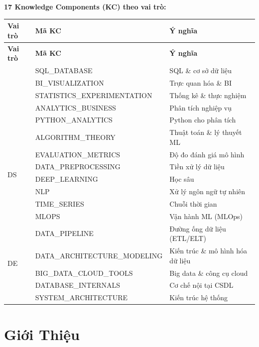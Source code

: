 \documentclass[12pt, a4paper]{report}
\begin{document}
\noindent\textbf{17 Knowledge Components (KC) theo vai trò:}

\begin{longtable}{lll}
\toprule
\textbf{Vai trò} & \textbf{Mã KC} & \textbf{Ý nghĩa} \\
\midrule
\endfirsthead
\toprule
\textbf{Vai trò} & \textbf{Mã KC} & \textbf{Ý nghĩa} \\
\midrule
\endhead
\bottomrule
\endfoot
\multirow{5}{*}{DA}
 & SQL\_DATABASE               & SQL \& cơ sở dữ liệu \\
 & BI\_VISUALIZATION           & Trực quan hóa \& BI \\
 & STATISTICS\_EXPERIMENTATION & Thống kê \& thực nghiệm \\
 & ANALYTICS\_BUSINESS         & Phân tích nghiệp vụ \\
 & PYTHON\_ANALYTICS           & Python cho phân tích \\
\midrule
\multirow{7}{*}{DS}
 & ALGORITHM\_THEORY           & Thuật toán \& lý thuyết ML \\
 & EVALUATION\_METRICS         & Độ đo đánh giá mô hình \\
 & DATA\_PREPROCESSING         & Tiền xử lý dữ liệu \\
 & DEEP\_LEARNING              & Học sâu \\
 & NLP                         & Xử lý ngôn ngữ tự nhiên \\
 & TIME\_SERIES                & Chuỗi thời gian \\
 & MLOPS                       & Vận hành ML (MLOps) \\
\midrule
\multirow{5}{*}{DE}
 & DATA\_PIPELINE              & Đường ống dữ liệu (ETL/ELT) \\
 & DATA\_ARCHITECTURE\_MODELING & Kiến trúc \& mô hình hóa dữ liệu \\
 & BIG\_DATA\_CLOUD\_TOOLS      & Big data \& công cụ cloud \\
 & DATABASE\_INTERNALS         & Cơ chế nội tại CSDL \\
 & SYSTEM\_ARCHITECTURE        & Kiến trúc hệ thống \\
\end{longtable}


\setcounter{page}{1}

\chapter{Giới Thiệu}
\label{chap:intro}
\end{document}
